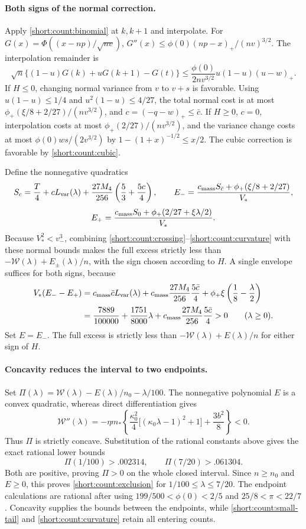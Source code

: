 \paragraph{Both signs of the normal correction.}
Apply \eqref{short:count:binomial} at $k,k+1$ and interpolate.
For $G(x)=\Phi((x-np)/\sqrt{nv})$,
$G''(x)\le\phi(0)(np-x)_+/(nv)^{3/2}$. The interpolation remainder is
\[
 \sqrt n\{(1-u)G(k)+uG(k+1)-G(t)\}
 \le\frac{\phi(0)}{2nv^{3/2}}u(1-u)(u-w)_+.
\]
If $H\le0$, changing normal variance from $v$ to $v+s$ is favorable.
Using $u(1-u)\le1/4$ and $u^2(1-u)\le4/27$, the total normal cost is
at most $\phi_+(\xi/8+2/27)/(nv^{3/2})$, and
$c=(-q-w)_+\le\bar c$.
If $H\ge0$, $c=0$, interpolation costs at most
$\phi_+(2/27)/(nv^{3/2})$, and the variance change costs at most
$\phi(0)ws/(2v^{3/2})$ by
$1-(1+x)^{-1/2}\le x/2$.
The cubic correction is favorable by \eqref{short:count:cubic}.

Define the nonnegative quadratics
\[
 S_c=\frac T4+cL_{\rm var}(\lambda)
              +\frac{27M_4}{256}\left(\frac53+\frac{5c}4\right),
\qquad
 E_-=\frac{c_{\rm mass}S_{\bar c}+\phi_+(\xi/8+2/27)}{V_*},
\]
\[
 E_+=\frac{c_{\rm mass}S_0+\phi_+(2/27+\xi\lambda/2)}{V_*}.
\]
Because $V_*^2<v_-^3$, combining
\eqref{short:count:crossing}--\eqref{short:count:curvature} with these
normal bounds makes the full excess strictly less than
$-\mathcal W(\lambda)+E_\pm(\lambda)/n$, with the sign chosen according to $H$.
A single envelope suffices for both signs, because
\begin{align*}
 V_*(E_--E_+)
 &=c_{\rm mass}\bar c L_{\rm var}(\lambda)
   +c_{\rm mass}\frac{27M_4}{256}\frac{5\bar c}{4}
   +\phi_+\xi\left(\frac18-\frac\lambda2\right)\\
 &=\frac{7889}{100000}+\frac{1751}{8000}\lambda
   +c_{\rm mass}\frac{27M_4}{256}\frac{5\bar c}{4}>0
   \qquad(\lambda\ge0).
\end{align*}
Set $E=E_-$. The full excess is strictly less than
$-\mathcal W(\lambda)+E(\lambda)/n$ for either sign of $H$.

\paragraph{Concavity reduces the interval to two endpoints.}
Set $\Pi(\lambda)=\mathcal W(\lambda)-E(\lambda)/n_0-\lambda/100$.
The nonnegative polynomial $E$ is a convex quadratic, whereas direct
differentiation gives
\[
 \mathcal W''(\lambda)=-\eta m_*\left\{
 \frac{\kappa_0^2}{4}\big[(\kappa_0\lambda-1)^2+1\big]+\frac{3b^2}{8}\right\}<0.
\]
Thus $\Pi$ is strictly concave. Substitution of the rational constants
above gives the exact rational lower bounds
\[
 \Pi(1/100)>.002314,\qquad \Pi(7/20)>.061304.
\]
Both are positive, proving $\Pi>0$ on the whole closed interval.
Since $n\ge n_0$ and $E\ge0$, this proves
\eqref{short:count:exclusion} for $1/100\le\lambda\le7/20$.
The endpoint calculations are rational after using
$199/500<\phi(0)<2/5$ and $25/8<\pi<22/7$.
Concavity supplies the bounds between the endpoints, while
\eqref{short:count:small-tail} and \eqref{short:count:curvature} retain
all entering counts.

